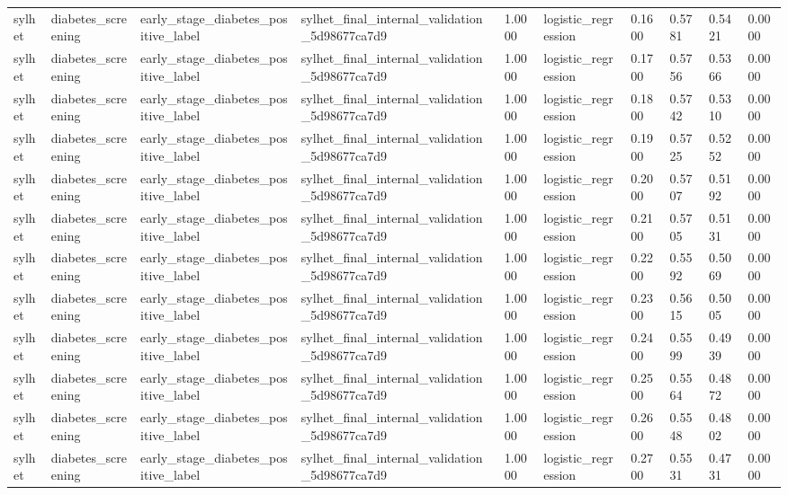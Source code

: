 \begin{tabular}{llllllllll}
sylhet & diabetes\_screening & early\_stage\_diabetes\_positive\_label & sylhet\_final\_internal\_validation\_5d98677ca7d9 & 1.0000 & logistic\_regression & 0.1600 & 0.5781 & 0.5421 & 0.0000 \\
sylhet & diabetes\_screening & early\_stage\_diabetes\_positive\_label & sylhet\_final\_internal\_validation\_5d98677ca7d9 & 1.0000 & logistic\_regression & 0.1700 & 0.5756 & 0.5366 & 0.0000 \\
sylhet & diabetes\_screening & early\_stage\_diabetes\_positive\_label & sylhet\_final\_internal\_validation\_5d98677ca7d9 & 1.0000 & logistic\_regression & 0.1800 & 0.5742 & 0.5310 & 0.0000 \\
sylhet & diabetes\_screening & early\_stage\_diabetes\_positive\_label & sylhet\_final\_internal\_validation\_5d98677ca7d9 & 1.0000 & logistic\_regression & 0.1900 & 0.5725 & 0.5252 & 0.0000 \\
sylhet & diabetes\_screening & early\_stage\_diabetes\_positive\_label & sylhet\_final\_internal\_validation\_5d98677ca7d9 & 1.0000 & logistic\_regression & 0.2000 & 0.5707 & 0.5192 & 0.0000 \\
sylhet & diabetes\_screening & early\_stage\_diabetes\_positive\_label & sylhet\_final\_internal\_validation\_5d98677ca7d9 & 1.0000 & logistic\_regression & 0.2100 & 0.5705 & 0.5131 & 0.0000 \\
sylhet & diabetes\_screening & early\_stage\_diabetes\_positive\_label & sylhet\_final\_internal\_validation\_5d98677ca7d9 & 1.0000 & logistic\_regression & 0.2200 & 0.5592 & 0.5069 & 0.0000 \\
sylhet & diabetes\_screening & early\_stage\_diabetes\_positive\_label & sylhet\_final\_internal\_validation\_5d98677ca7d9 & 1.0000 & logistic\_regression & 0.2300 & 0.5615 & 0.5005 & 0.0000 \\
sylhet & diabetes\_screening & early\_stage\_diabetes\_positive\_label & sylhet\_final\_internal\_validation\_5d98677ca7d9 & 1.0000 & logistic\_regression & 0.2400 & 0.5599 & 0.4939 & 0.0000 \\
sylhet & diabetes\_screening & early\_stage\_diabetes\_positive\_label & sylhet\_final\_internal\_validation\_5d98677ca7d9 & 1.0000 & logistic\_regression & 0.2500 & 0.5564 & 0.4872 & 0.0000 \\
sylhet & diabetes\_screening & early\_stage\_diabetes\_positive\_label & sylhet\_final\_internal\_validation\_5d98677ca7d9 & 1.0000 & logistic\_regression & 0.2600 & 0.5548 & 0.4802 & 0.0000 \\
sylhet & diabetes\_screening & early\_stage\_diabetes\_positive\_label & sylhet\_final\_internal\_validation\_5d98677ca7d9 & 1.0000 & logistic\_regression & 0.2700 & 0.5531 & 0.4731 & 0.0000 \\

\end{tabular}
